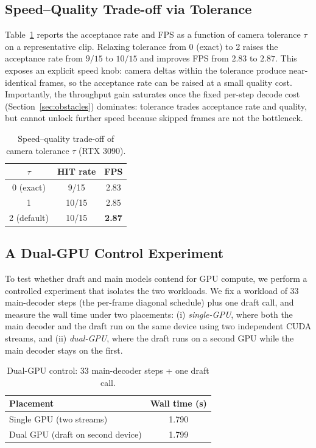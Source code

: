 \documentclass[10pt, twocolumn]{article}
\begin{document}
\subsection{Speed--Quality Trade-off via Tolerance}
\label{sec:tolerance}

Table~\ref{tab:tolerance} reports the acceptance rate and FPS as a function of camera tolerance $\tau$ on a representative clip. Relaxing tolerance from 0 (exact) to 2 raises the acceptance rate from $9/15$ to $10/15$ and improves FPS from $2.83$ to $2.87$. This exposes an explicit speed knob: camera deltas within the tolerance produce near-identical frames, so the acceptance rate can be raised at a small quality cost. Importantly, the throughput gain saturates once the fixed per-step decode cost (Section~\ref{sec:obstacles}) dominates: tolerance trades acceptance rate and quality, but cannot unlock further speed because skipped frames are not the bottleneck.

\begin{table}[!ht]
  \centering
  \small
  \caption{Speed--quality trade-off of camera tolerance $\tau$ (RTX 3090).}
  \label{tab:tolerance}
  \begin{tabular}{ccc}
    \toprule
    $\tau$ & HIT rate & FPS \\
    \midrule
    0 (exact) & 9/15 & 2.83 \\
    1 & 10/15 & 2.85 \\
    2 (default) & 10/15 & \textbf{2.87} \\
    \bottomrule
  \end{tabular}
\end{table}

\subsection{A Dual-GPU Control Experiment}
\label{sec:dualgpu}

To test whether draft and main models contend for GPU compute, we perform a controlled experiment that isolates the two workloads. We fix a workload of 33 main-decoder steps (the per-frame diagonal schedule) plus one draft call, and measure the wall time under two placements: (i) \emph{single-GPU}, where both the main decoder and the draft run on the same device using two independent CUDA streams, and (ii) \emph{dual-GPU}, where the draft runs on a second GPU while the main decoder stays on the first.

\begin{table}[!ht]
  \centering
  \small
  \caption{Dual-GPU control: 33 main-decoder steps + one draft call.}
  \label{tab:dualgpu}
  \begin{tabular}{lc}
    \toprule
    Placement & Wall time (s) \\
    \midrule
    Single GPU (two streams) & 1.790 \\
    Dual GPU (draft on second device) & 1.799 \\
    \bottomrule
  \end{tabular}
\end{table}
\end{document}
